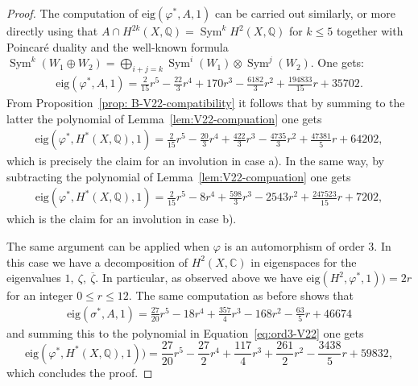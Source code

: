 \documentclass[a4paper,11pt]{amsart}
\newcommand{\Q}{{\mathbb Q}}
\newcommand{\eig}{{\mathrm{eig}}}
\DeclareMathOperator{\Sym}{Sym}
\theoremstyle{plain}
\theoremstyle{remark}
\begin{document}
\begin{proof}
The computation of $\eig(\varphi^*, A, 1)$ can be carried out similarly, or more directly using that $A\cap H^{2k}(X,\Q) = \Sym^k H^2(X,\Q)$ for $k\leq 5$ together with Poincaré duality and the well-known formula $\Sym^k(W_1\oplus W_2) = \bigoplus_{i+j = k} \Sym^i(W_1) \otimes \Sym^j(W_2)$.
One gets:
\begin{align*}
\eig(\varphi^*, A, 1) = \frac{2}{15}r^5 - \frac{22}{3}r^4 + 170r^3 - \frac{6182}{3}r^2 + \frac{194833}{15}r + 35702.
\end{align*}
From Proposition~\ref{prop: B-V22-compatibility} it follows that by summing to the latter the polynomial of Lemma~\ref{lem:V22-compuation} one gets
\begin{align*}
\eig(\varphi^*, H^*(X,\mathbb{Q}), 1)= \frac{2}{15}r^5 - \frac{20}{3}r^4 + \frac{422}{3}r^3 - \frac{4735}{3}r^2 + \frac{47381}{5}r + 64202,
\end{align*}
which is precisely the claim for an involution in case a).
In the same way, by subtracting the polynomial of Lemma~\ref{lem:V22-compuation} one gets
\begin{align*}
\eig(\varphi^*, H^*(X,\mathbb{Q}),1)=
\frac{2}{15}r^5 - 8r^4 + \frac{598}{3}r^3 -2543r^2 + \frac{247523}{15}r + 7202,
\end{align*}
which is the claim for an involution in case b).
\bigskip

The same argument can be applied when \(\varphi\) is an automorphism of order 3.
In this case we have a decomposition of \(H^{2}(X,\mathbb{C})\) in eigenspaces for the eigenvalues $1,\ \mathbb \zeta,\ \overline{\zeta}$. In particular, as observed above we have $\eig(H^2, \varphi^*, 1))= 2r$ for an integer $0\leq r\leq 12$.
The same computation as before shows that
\begin{align*}
    \eig(\sigma^*, A,1) = \frac{27}{20}r^5 - 18r^4 + \frac{357}{4}r^3 - 168r^2 - \frac{63}{5}r + 46674
\end{align*}
and summing this to the polynomial in Equation~\eqref{eq:ord3-V22} one gets 
\[\eig(\varphi^*,H^*(X,\mathbb{Q}),1))=\frac{27}{20}r^5 - \frac{27}{2}r^4 + \frac{117}{4}r^3 + \frac{261}{2}r^2 - \frac{3438}{5}r + 59832,\]
which concludes the proof.

\end{proof}
\end{document}
